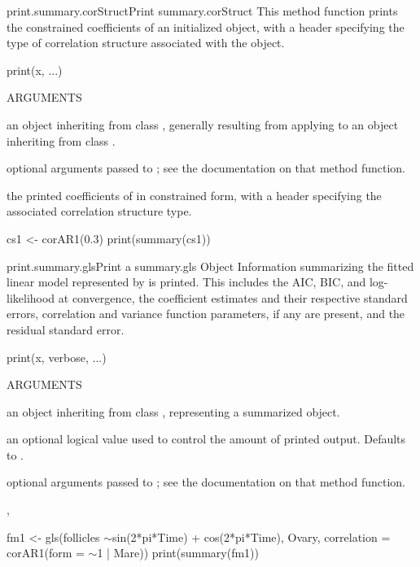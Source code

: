 \documentclass[pdftex]{article} \usepackage{url,graphicx}
\renewcommand{\Twiddle}{\mbox{\(\sim\)}}
\begin{document}
\begin{Helpfile}{print.summary.corStruct}{Print summary.corStruct}
This method function prints the constrained coefficients of
an initialized  object, with a header specifying the
type of correlation structure associated with the object.
\begin{Example}
print(x, ...)
\end{Example}
\begin{Argument}{ARGUMENTS}
\item[\Co{x:}]
an object inheriting from class ,
generally resulting from applying  to an object
inheriting from class .
\item[\Co{...:}]
optional arguments passed to ; see
the documentation on that method function.
\end{Argument}
the printed coefficients of  in constrained form, with a
header specifying the associated correlation structure type.
\need 15pt
\vspace{-16pt} 
\begin{Example}
cs1 <- corAR1(0.3)
print(summary(cs1))
\end{Example}
\end{Helpfile}
\begin{Helpfile}{print.summary.gls}{Print a summary.gls Object}
Information summarizing the fitted linear model represented by
 is printed. This includes the AIC, BIC, and 
log-likelihood at convergence, the coefficient estimates and
their respective standard errors,  correlation and variance
function parameters, if any are present, and the residual standard
error.
\begin{Example}
print(x, verbose, ...)
\end{Example}
\begin{Argument}{ARGUMENTS}
\item[\Co{x:}]
an object inheriting from class ,
representing a summarized  object.
\item[\Co{verbose:}]
an optional logical value used to control the amount of
printed output. Defaults to .
\item[\Co{...:}]
optional arguments passed to ; see
the documentation on that method function.
\end{Argument}
, 
\need 15pt
\vspace{-16pt} 
\begin{Example}
fm1 <- gls(follicles \Twiddle sin(2*pi*Time) + cos(2*pi*Time), Ovary,
           correlation = corAR1(form = \Twiddle 1 | Mare))
print(summary(fm1))
\end{Example}
\end{Helpfile}
\end{document}
